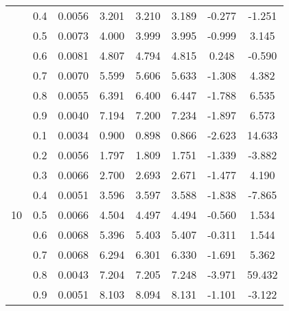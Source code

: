 \documentclass[11pt,a4paper]{report}
\begin{document}
\begin{longtable}{ | c | c || c | c | c | c | c | c | }
 & 0.4 & 0.0056 & 3.201 & 3.210 & 3.189 & -0.277 & -1.251 \\
 & 0.5 & 0.0073 & 4.000 & 3.999 & 3.995 & -0.999 & 3.145 \\
 & 0.6 & 0.0081 & 4.807 & 4.794 & 4.815 & 0.248 & -0.590 \\
 & 0.7 & 0.0070 & 5.599 & 5.606 & 5.633 & -1.308 & 4.382 \\
 & 0.8 & 0.0055 & 6.391 & 6.400 & 6.447 & -1.788 & 6.535 \\
 & 0.9 & 0.0040 & 7.194 & 7.200 & 7.234 & -1.897 & 6.573 \\
 \hline
\multirow{9}{*}{10} & 0.1 & 0.0034 & 0.900 & 0.898 & 0.866 & -2.623 & 14.633 \\
 & 0.2 & 0.0056 & 1.797 & 1.809 & 1.751 & -1.339 & -3.882 \\
 & 0.3 & 0.0066 & 2.700 & 2.693 & 2.671 & -1.477 & 4.190 \\
 & 0.4 & 0.0051 & 3.596 & 3.597 & 3.588 & -1.838 & -7.865 \\
 & 0.5 & 0.0066 & 4.504 & 4.497 & 4.494 & -0.560 & 1.534 \\
 & 0.6 & 0.0068 & 5.396 & 5.403 & 5.407 & -0.311 & 1.544 \\
 & 0.7 & 0.0068 & 6.294 & 6.301 & 6.330 & -1.691 & 5.362 \\
 & 0.8 & 0.0043 & 7.204 & 7.205 & 7.248 & -3.971 & 59.432 \\
 & 0.9 & 0.0051 & 8.103 & 8.094 & 8.131 & -1.101 & -3.122 \\
 \hline
\hline
\end{longtable}
\end{document}
